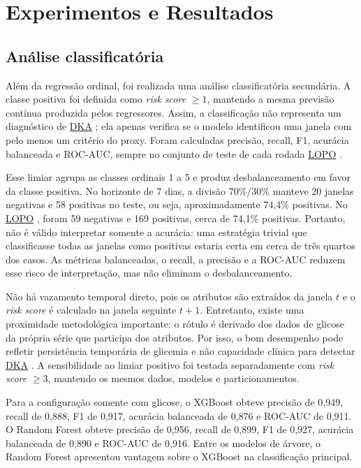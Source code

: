 \documentclass[12pt,a4paper]{article}
\DeclareRobustCommand{\sigla}[1]{%
    \texorpdfstring{\hyperlink{sigla:#1}{#1}}{#1}%
}
\begin{document}
\section{Experimentos e Resultados}

\subsection{Análise classificatória}
Além da regressão ordinal, foi realizada uma análise classificatória
secundária. A classe positiva foi definida como
\textit{risk score} $\geq 1$, mantendo a mesma previsão contínua produzida
pelos regressores. Assim, a classificação não representa um diagnóstico de
\sigla{DKA}; ela apenas verifica se o modelo identificou uma janela com pelo menos um
critério do proxy. Foram calculadas precisão, recall, F1, acurácia balanceada e
ROC-AUC, sempre no conjunto de teste de cada rodada \sigla{LOPO}.

Esse limiar agrupa as classes ordinais 1 a 5 e produz desbalanceamento em favor
da classe positiva. No horizonte de 7 dias, a divisão 70\%/30\% manteve 20
janelas negativas e 58 positivas no teste, ou seja, aproximadamente 74,4\%
positivas. No \sigla{LOPO}, foram 59 negativas e 169 positivas, cerca de
74,1\% positivas. Portanto, não é válido interpretar somente a acurácia: uma
estratégia trivial que classificasse todas as janelas como positivas estaria
certa em cerca de três quartos dos casos. As métricas balanceadas, o recall,
a precisão e a ROC-AUC reduzem esse risco de interpretação, mas não eliminam
o desbalanceamento.

Não há vazamento temporal direto, pois os atributos são extraídos da janela
$t$ e o \textit{risk score} é calculado na janela seguinte $t+1$. Entretanto,
existe uma proximidade metodológica importante: o rótulo é derivado dos dados
de glicose da própria série que participa dos atributos. Por isso, o bom
desempenho pode refletir persistência temporária de glicemia e não capacidade
clínica para detectar \sigla{DKA}. A sensibilidade ao limiar positivo foi
testada separadamente com \textit{risk score} $\geq 3$, mantendo os mesmos
dados, modelos e particionamentos.

Para a configuração somente com glicose, o XGBoost obteve precisão de 0,949,
recall de 0,888, F1 de 0,917, acurácia balanceada de 0,876 e ROC-AUC de 0,911.
O Random Forest obteve precisão de 0,956, recall de 0,899, F1 de 0,927,
acurácia balanceada de 0,890 e ROC-AUC de 0,916. Entre os modelos de árvore, o Random Forest apresentou vantagem sobre o
XGBoost na classificação principal.
\end{document}
